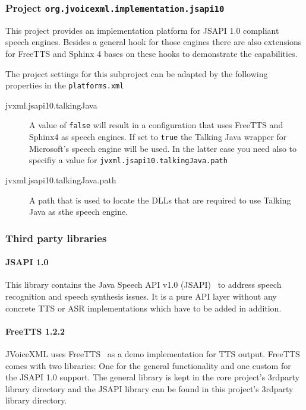 \documentclass[11pt,a4paper]{article}
\begin{document}
\subsubsection{Project \texttt{org.jvoicexml.implementation.jsapi10}}

This project provides an implementation platform for JSAPI 1.0 compliant
speech engines. Besides a general hook for those engines there are also
extensions for FreeTTS and Sphinx 4 bases on these hooks to demonstrate the
capabilities.

The project settings for this subproject can be adapted by the following
properties in the \texttt{platforms.xml}

\begin{description}
\item[jvxml.jsapi10.talkingJava] A value of \texttt{false} will result in a
configuration that uses FreeTTS and Sphinx4 as speech engines. If set to
\texttt{true} the Talking Java wrapper for Microsoft's speech engine will be
used. In the latter case you need also to specifiy a value for
\texttt{jvxml.jsapi10.talkingJava.path}
\item[jvxml.jsapi10.talkingJava.path] A path that is used to locate the DLLs
that are required to use Talking Java as sthe speech engine.
\end{description}

\subsubsection{Third party libraries}
\label{sec:jsapi10-third-party-libr}

\paragraph{JSAPI 1.0}

This library contains the Java Speech API v1.0
(JSAPI)~\cite{sun:jsapi} to address speech recognition and speech synthesis
issues. It is a pure API layer without any concrete TTS or ASR implementations
which have to be added in addition.


\paragraph{FreeTTS 1.2.2}
\label{sec:freetts}

JVoiceXML uses FreeTTS~\cite{freetts} as a demo implementation for TTS output.
FreeTTS comes with two libraries: One for the general functionality
and one custom for the JSAPI 1.0 support.
The general library is kept in the core project's 3rdparty library directory
and the JSAPI library can be found in this project's 3rdparty library directory.
\end{document}
